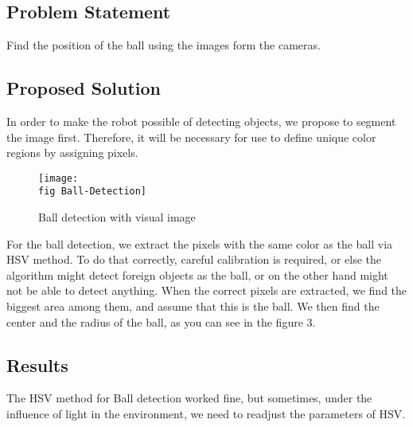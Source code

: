 \subsection*{Problem Statement}
Find the position of the ball using the images form the cameras.

\subsection*{Proposed Solution}
In order to make the robot possible of detecting objects, we propose to segment the image first. Therefore, it will be necessary for use to define unique color regions by assigning pixels.

\begin{figure}[ht]
	\texttt{[image: \\fig Ball-Detection]}
	\caption{Ball detection with visual image}
	\label{j figure distance measurement}
\end{figure}

For the ball detection, we extract the pixels with the same color as the
ball via HSV method. To do that correctly, careful calibration is required, or else the
algorithm might detect foreign objects as the ball, or on the other hand might not be able to detect anything. When the correct pixels are extracted, we find the biggest area among them, and assume that this is the ball. We then find the center and the radius of the ball, as you can see in the figure 3.

\subsection*{Results}
The HSV method for Ball detection worked fine, but sometimes, under the influence of light in the environment, we need to readjust the parameters of HSV.
